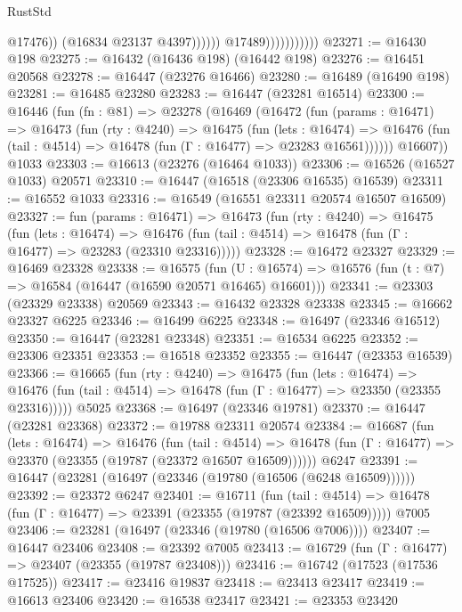 \begin{lexlean}{RustStd}
\begin{coremodule}
{\begin{coremodule}
{{{{{{{{{{{{{{{{{{{{{{{{{{{{{{{{{{{{{{{{{{{{{{{{{{{{{{{                                        @17476))
                                    (@16834 @23137 @4397))))))
                          @17489)))))))))))
@23271 := @16430 @198
@23275 := @16432 (@16436 @198) (@16442 @198)
@23276 := @16451 @20568
@23278 := @16447 (@23276 @16466)
@23280 := @16489 (@16490 @198)
@23281 := @16485 @23280
@23283 := @16447 (@23281 @16514)
@23300 := @16446
    (fun (fn : @81) =>
    @23278
      (@16469
        (@16472
          (fun (params : @16471) =>
          @16473
            (fun (rty : @4240) =>
            @16475
              (fun (lets : @16474) =>
              @16476 (fun (tail : @4514) => @16478 (fun (Γ : @16477) => @23283 @16561))))))
        @16607))
    @1033
@23303 := @16613 (@23276 (@16464 @1033))
@23306 := @16526 (@16527 @1033) @20571
@23310 := @16447 (@16518 (@23306 @16535) @16539)
@23311 := @16552 @1033
@23316 := @16549 (@16551 @23311 @20574 @16507 @16509)
@23327 := fun (params : @16471) =>
  @16473
    (fun (rty : @4240) =>
    @16475
      (fun (lets : @16474) =>
      @16476 (fun (tail : @4514) => @16478 (fun (Γ : @16477) => @23283 (@23310 @23316)))))
@23328 := @16472 @23327
@23329 := @16469 @23328
@23338 := @16575
    (fun (U : @16574) => @16576 (fun (t : @7) => @16584 (@16447 (@16590 @20571 @16465) @16601)))
@23341 := @23303 (@23329 @23338) @20569
@23343 := @16432 @23328 @23338
@23345 := @16662 @23327 @6225
@23346 := @16499 @6225
@23348 := @16497 (@23346 @16512)
@23350 := @16447 (@23281 @23348)
@23351 := @16534 @6225
@23352 := @23306 @23351
@23353 := @16518 @23352
@23355 := @16447 (@23353 @16539)
@23366 := @16665
    (fun (rty : @4240) =>
    @16475
      (fun (lets : @16474) =>
      @16476 (fun (tail : @4514) => @16478 (fun (Γ : @16477) => @23350 (@23355 @23316)))))
    @5025
@23368 := @16497 (@23346 @19781)
@23370 := @16447 (@23281 @23368)
@23372 := @19788 @23311 @20574
@23384 := @16687
    (fun (lets : @16474) =>
    @16476
      (fun (tail : @4514) =>
      @16478 (fun (Γ : @16477) => @23370 (@23355 (@19787 (@23372 @16507 @16509))))))
    @6247
@23391 := @16447 (@23281 (@16497 (@23346 (@19780 (@16506 (@6248 @16509))))))
@23392 := @23372 @6247
@23401 := @16711
    (fun (tail : @4514) => @16478 (fun (Γ : @16477) => @23391 (@23355 (@19787 (@23392 @16509)))))
    @7005
@23406 := @23281 (@16497 (@23346 (@19780 (@16506 @7006))))
@23407 := @16447 @23406
@23408 := @23392 @7005
@23413 := @16729 (fun (Γ : @16477) => @23407 (@23355 (@19787 @23408)))
@23416 := @16742 (@17523 (@17536 @17525))
@23417 := @23416 @19837
@23418 := @23413 @23417
@23419 := @16613 @23406
@23420 := @16538 @23417
@23421 := @23353 @23420
}}}}}}}}}}}}}}}}}}}}}}}}}}}}}}}}}}}}}}}}}}}}}}}}}}}}}}}
\end{coremodule}}
\end{coremodule}
\end{lexlean}
